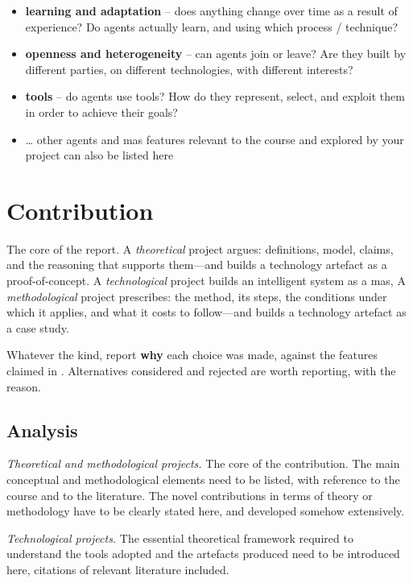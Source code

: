 \documentclass[11pt,a4paper]{scrartcl}
\begin{document}
\begin{guidance}
\begin{itemize}
  \item \textbf{learning and adaptation} – does anything change over time as a result of experience? 
  Do agents actually learn, and using which process / technique?
  
  \item \textbf{openness and heterogeneity} – can agents join or leave? 
  Are they built by different parties, on different technologies, with different interests?

  \item \textbf{tools} – do agents use tools? 
  How do they represent, select, and exploit them in order to achieve their goals?
  
  \item \ldots{} other agents and \ac{mas} features relevant to the course and explored by your project can also be listed here
\end{itemize}
\end{guidance}

\section{Contribution}
\label{sec:contribution}

\begin{guidance}
The core of the report.
%
A \emph{theoretical} project argues: definitions, model, claims, and the reasoning that supports them—and builds a technology artefact as a proof-of-concept.
%
A \emph{technological} project builds an intelligent system as a \ac{mas}, 
%
A \emph{methodological} project prescribes: the method, its steps, the conditions under which it applies, and what it costs to follow—and builds a technology artefact as a case study.

Whatever the kind, report \textbf{why} each choice was made, against the features claimed in . Alternatives considered and rejected are worth reporting, with the reason.
\end{guidance}

\subsection{Analysis}
\label{sec:analysis}

\begin{guidance}
\emph{Theoretical and methodological projects.} 
%
The core of the contribution. 
%
The main conceptual and methodological elements need to be listed, with reference to the course and to the literature.
%
The novel contributions in terms of theory or methodology have to be clearly stated here, and developed somehow extensively.

\emph{Technological projects.} 
%
The essential theoretical framework required to understand the tools adopted and the artefacts produced need to be introduced here, citations of relevant literature included.
\end{guidance}
\end{document}
